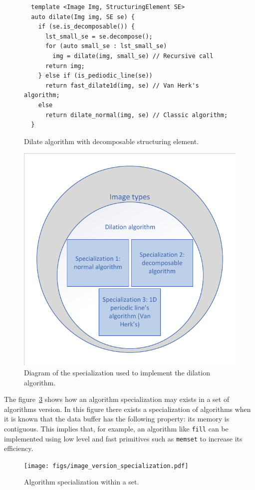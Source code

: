 \begin{figure}[htbp]
  \centering
  \begin{verbatim}
  template <Image Img, StructuringElement SE>
  auto dilate(Img img, SE se) {
    if (se.is_decomposable()) {
      lst_small_se = se.decompose();
      for (auto small_se : lst_small_se)
        img = dilate(img, small_se) // Recursive call
      return img;
    } else if (is_pediodic_line(se))
      return fast_dilate1d(img, se) // Van Herk's algorithm;
    else
      return dilate_normal(img, se) // Classic algorithm;
  }
  \end{verbatim}

  \caption{Dilate algorithm with decomposable structuring element.}
  \label{code:decomp.dilate}
\end{figure}

\begin{figure}[htbp]
  \centering
  \includegraphics[width=.5\linewidth]{figs/dilation_specialization_diagram.pdf}
  \caption{Diagram of the specialization used to implement the dilation algorithm.}
  \label{fig:dilation.specialization.diagram}
\end{figure}

The figure~\ref{fig:image.specialization} shows how an algorithm specialization may exists in a set of algorithms
version. In this figure there exists a specialization of algorithms when it is known that the data buffer has the
following property: its memory is contiguous. This implies that, for example, an algorithm like \texttt{fill} can be
implemented using low level and fast primitives such as \texttt{memset} to increase its efficiency.

\begin{figure}[htbp]
  \centering
  \texttt{[image: figs/image\_version\_specialization.pdf]}
  \caption{Algorithm specialization within a set.}
  \label{fig:image.specialization}
\end{figure}

